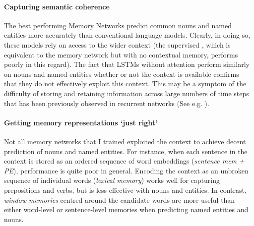 \paragraph{Capturing semantic coherence} The best performing Memory
Networks predict common nouns and named entities more
accurately than conventional language models. Clearly, in doing so,
these models rely on access to the wider context (the
supervised {\small {}}, which is equivalent to the
memory network but with no contextual memory, performs poorly in this
regard). The fact that LSTMs without attention perform similarly on
nouns and named entities whether or not the context is available
confirms that they do not effectively exploit this context. This may
be a symptom of the difficulty of storing and retaining information
across large numbers of time steps that has been previously observed
in recurrent networks (See e.g. \cite{bengio1994learning}). 



\paragraph{Getting memory representations `just right'} Not all memory
networks that I trained exploited the context to achieve
decent prediction of nouns and named entities.
For instance, when each sentence in the context is stored as an ordered sequence of word
embeddings (\emph{sentence mem + PE}), performance is quite
poor in general. Encoding the context as an unbroken sequence of individual
words (\emph{lexical memory}) works well for capturing prepositions
and verbs, but is less effective with nouns and entities. In contrast,
\emph{window memories} centred around the
candidate words are more useful than either word-level or
sentence-level memories when predicting named entities and nouns. 




